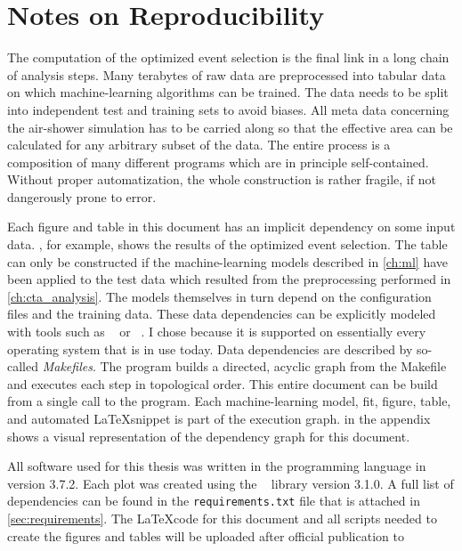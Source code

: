 
\chapter{Notes on Reproducibility}
\label{ch:repro}

The computation of the optimized event selection is the final link in a long chain of analysis steps. 
Many terabytes of raw data are preprocessed into tabular data on which machine-learning algorithms can be trained. 
The data needs to be split into independent test and training sets to avoid biases. All meta data concerning the air-shower
simulation has to be carried along so that the effective area can be calculated for any arbitrary subset of the data. 
The entire process is a composition of many different programs which are in principle self-contained. 
Without proper automatization, the whole construction is rather fragile, if not dangerously prone to error.

Each figure and table in this document has an implicit dependency on some input data.
, for example, shows the results of the optimized event selection.
The table can only be constructed if the machine-learning models described in \cref{ch:ml} have been applied to the test data 
which resulted from the preprocessing performed in \cref{ch:cta_analysis}. 
The models themselves in turn depend on the configuration files and the training data. 
These data dependencies can be explicitly modeled with tools such as 
\make~\cite{make} or \snakemake~\cite{snakemake}.
I chose \make because it is supported on essentially every operating system that is in use today.   
Data dependencies are described by so-called \emph{Makefiles}. The \make program builds a directed, acyclic graph from 
the Makefile and executes each step in topological order. 
This entire document can be build from a single call to the \make program. Each machine-learning model, fit, figure, table, and automated 
\LaTeX snippet is part of the execution graph. 
 in the appendix shows a visual representation of the dependency graph for this document.

All software used for this thesis was written in the \python programming language in version 3.7.2. Each plot was created using the 
\matplotlib~\cite{matplotlib} library version 3.1.0. A full list of \python dependencies can be found in the \texttt{requirements.txt} file that is 
attached in \cref{sec:requirements}.
The \LaTeX code for this document and all scripts needed to create the figures and tables will be uploaded after official publication to 

